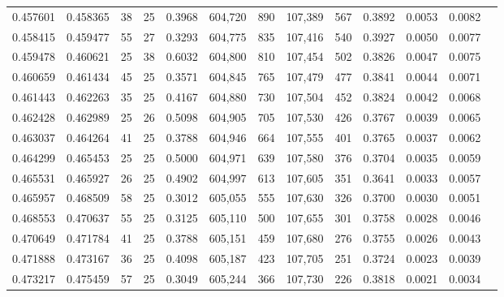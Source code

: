 \begin{tabular}{rrrrrrrrrrrrr}
0.457601 & 0.458365 &    38 &  25 &                                     0.3968 & 604,720 &     890 & 107,389 &     567 & 0.3892 & 0.0053 & 0.0082 \\
0.458415 & 0.459477 &    55 &  27 &                                     0.3293 & 604,775 &     835 & 107,416 &     540 & 0.3927 & 0.0050 & 0.0077 \\
0.459478 & 0.460621 &    25 &  38 &                                     0.6032 & 604,800 &     810 & 107,454 &     502 & 0.3826 & 0.0047 & 0.0075 \\
0.460659 & 0.461434 &    45 &  25 &                                     0.3571 & 604,845 &     765 & 107,479 &     477 & 0.3841 & 0.0044 & 0.0071 \\
0.461443 & 0.462263 &    35 &  25 &                                     0.4167 & 604,880 &     730 & 107,504 &     452 & 0.3824 & 0.0042 & 0.0068 \\
0.462428 & 0.462989 &    25 &  26 &                                     0.5098 & 604,905 &     705 & 107,530 &     426 & 0.3767 & 0.0039 & 0.0065 \\
0.463037 & 0.464264 &    41 &  25 &                                     0.3788 & 604,946 &     664 & 107,555 &     401 & 0.3765 & 0.0037 & 0.0062 \\
0.464299 & 0.465453 &    25 &  25 &                                     0.5000 & 604,971 &     639 & 107,580 &     376 & 0.3704 & 0.0035 & 0.0059 \\
0.465531 & 0.465927 &    26 &  25 &                                     0.4902 & 604,997 &     613 & 107,605 &     351 & 0.3641 & 0.0033 & 0.0057 \\
0.465957 & 0.468509 &    58 &  25 &                                     0.3012 & 605,055 &     555 & 107,630 &     326 & 0.3700 & 0.0030 & 0.0051 \\
0.468553 & 0.470637 &    55 &  25 &                                     0.3125 & 605,110 &     500 & 107,655 &     301 & 0.3758 & 0.0028 & 0.0046 \\
0.470649 & 0.471784 &    41 &  25 &                                     0.3788 & 605,151 &     459 & 107,680 &     276 & 0.3755 & 0.0026 & 0.0043 \\
0.471888 & 0.473167 &    36 &  25 &                                     0.4098 & 605,187 &     423 & 107,705 &     251 & 0.3724 & 0.0023 & 0.0039 \\
0.473217 & 0.475459 &    57 &  25 &                                     0.3049 & 605,244 &     366 & 107,730 &     226 & 0.3818 & 0.0021 & 0.0034 \\

\end{tabular}
